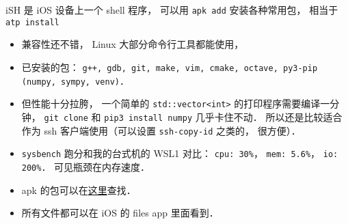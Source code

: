 

\begin{issues}
\issueDraft
\end{issues}

iSH 是 iOS 设备上一个 shell 程序， 可以用 \verb|apk add| 安装各种常用包， 相当于 \verb|atp install|

\begin{itemize}
\item 兼容性还不错， Linux 大部分命令行工具都能使用， \item 已安装的包： \verb|g++, gdb, git, make, vim, cmake, octave, py3-pip (numpy, sympy, venv)|．
\item 但性能十分拉胯， 一个简单的 \verb|std::vector<int>| 的打印程序需要编译一分钟， \verb|git clone| 和 \verb|pip3 install numpy| 几乎卡住不动． 所以还是比较适合作为 ssh 客户端使用（可以设置 \verb|ssh-copy-id| 之类的， 很方便）．
\item \verb|sysbench| 跑分和我的台式机的 WSL1 对比： \verb|cpu: 30%|， \verb|mem: 5.6%|， \verb|io: 200%|． 可见瓶颈在内存速度．
\item apk 的包可以在\href{https://pkgs.alpinelinux.org/}{这里}查找．
\item 所有文件都可以在 iOS 的 files app 里面看到．
\end{itemize}

